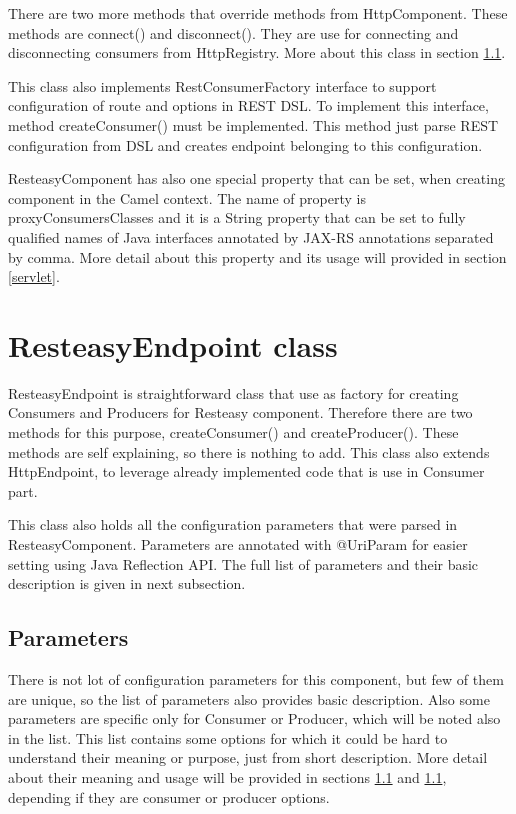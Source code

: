 \documentclass[12pt,final,oneside]{fithesis2}
\begin{document}
There are two more methods that override methods from HttpComponent. These methods are connect() and disconnect(). They are use for connecting and disconnecting consumers from HttpRegistry. More about this class in section \ref{}. 

This class also implements RestConsumerFactory interface to support configuration of route and options in REST DSL. To implement this interface, method createConsumer() must be implemented. This method just parse REST configuration from DSL and creates endpoint belonging to this configuration.

ResteasyComponent has also one special property that can be set, when creating component in the Camel context. The name of property is proxyConsumersClasses and it is a String property that can be set to fully qualified names of Java interfaces annotated by JAX-RS annotations separated by comma. More detail about this property and its usage will provided in section \ref{servlet}.

\section{ResteasyEndpoint class}
ResteasyEndpoint is straightforward class that use as factory for creating Consumers and Producers for Resteasy component. Therefore there are two methods for this purpose, createConsumer() and createProducer(). These methods are self explaining, so there is nothing to add. This class also extends HttpEndpoint, to leverage already implemented code that is use in Consumer part.

This class also holds all the configuration parameters that were parsed in ResteasyComponent. Parameters are annotated with @UriParam for easier setting using Java Reflection API. The full list of parameters and their basic description is given in next subsection.

\subsection{Parameters}
There is not lot of configuration parameters for this component, but few of them are unique, so the list of parameters also provides basic description. Also some parameters are specific only for Consumer or Producer, which will be noted also in the list. This list contains some options for which it could be hard to understand their meaning or purpose, just from short description. More detail about their meaning and usage will be provided in sections \ref{} and \ref{}, depending if they are consumer or producer options.  
\end{document}
